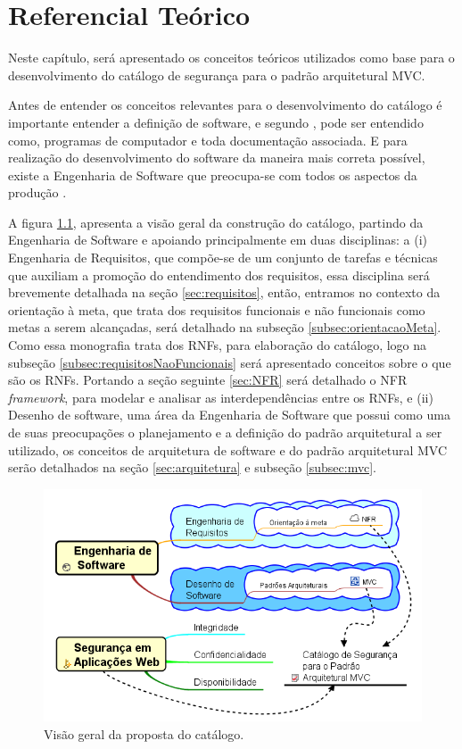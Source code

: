 \chapter[Referencial Teórico]{Referencial Teórico}
\label{chap:referencialTeorico}

Neste capítulo, será apresentado os conceitos teóricos utilizados como base para o desenvolvimento do catálogo de segurança para o padrão arquitetural MVC.

Antes de entender os conceitos relevantes para o desenvolvimento do catálogo é importante entender a definição de software, e segundo \cite{sommerville2003engenharia}, pode ser entendido como, programas de computador e toda documentação associada. E para realização do desenvolvimento do software da maneira mais correta possível, existe a Engenharia de Software que preocupa-se com todos os aspectos da produção \cite{sommerville2003engenharia}. 

A figura \ref{BigPicture}, apresenta a visão geral da construção do catálogo, partindo da Engenharia de Software e apoiando principalmente em duas disciplinas: a (i) Engenharia de Requisitos, que compõe-se de um conjunto de tarefas e técnicas que auxiliam a promoção do entendimento dos requisitos, essa disciplina será brevemente detalhada na seção \ref{sec:requisitos}, então, entramos no contexto da orientação à meta, que trata dos requisitos funcionais e não funcionais como metas a serem alcançadas, será detalhado na subseção \ref{subsec:orientacaoMeta}. Como essa monografia trata dos RNFs, para elaboração do catálogo, logo na subseção \ref{subsec:requisitosNaoFuncionais} será apresentado conceitos sobre o que são os RNFs. Portando a seção seguinte \ref{sec:NFR} será detalhado o NFR \textit{framework}, para modelar e analisar as interdependências entre os RNFs, e (ii) Desenho de software, uma área da Engenharia de Software que possui como uma de suas preocupações o planejamento e a definição do padrão arquitetural a ser utilizado, os conceitos de arquitetura de software e do padrão arquitetural MVC serão detalhados na seção \ref{sec:arquitetura} e subseção \ref{subsec:mvc}.

\begin{figure}[h!]
	\centering
	\includegraphics[keepaspectratio=true,scale=0.65]{figuras/bigPicture.png}
	\caption{Visão geral da proposta do catálogo.}
	\label{BigPicture}
\end{figure}

